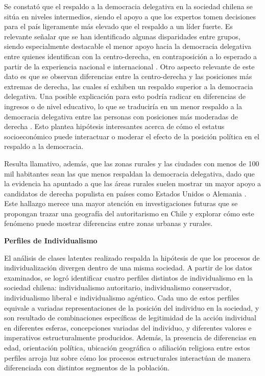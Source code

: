 \documentclass[12pt,twoside]{templates/facsothesis}
\begin{document}
Se constató que el respaldo a la democracia delegativa en la sociedad chilena se sitúa en niveles intermedios, siendo el apoyo a que los expertos tomen decisiones para el país ligeramente más elevado que el respaldo a un líder fuerte. Es relevante señalar que se han identificado algunas disparidades entre grupos, siendo especialmente destacable el menor apoyo hacia la democracia delegativa entre quienes identifican con la centro-derecha, en contraposición a lo esperado a partir de la experiencia nacional \citep{navia2019} e internacional \citep{donovan2021}. Otro aspecto relevante de este dato es que se observan diferencias entre la centro-derecha y las posiciones más extremas de derecha, las cuales sí exhiben un respaldo superior a la democracia delegativa. Una posible explicación para esto podría radicar en diferencias de ingresos o de nivel educativo, lo que se traduciría en un menor respaldo a la democracia delegativa entre las personas con posiciones más moderadas de derecha \citep{kang2018}. Esto plantea hipótesis interesantes acerca de cómo el estatus socioeconómico puede interactuar o moderar el efecto de la posición política en el respaldo a la democracia.

Resulta llamativo, además, que las zonas rurales y las ciudades con menos de 100 mil habitantes sean las que menos respaldan la democracia delegativa, dado que la evidencia ha apuntado a que las áreas rurales suelen mostrar un mayor apoyo a candidatos de derecha populista en países como Estados Unidos \citep{schafft2021} o Alemania \citep{deppisch2022}. Este hallazgo merece una mayor atención en investigaciones futuras que se propongan trazar una geografía del autoritarismo en Chile y explorar cómo este fenómeno puede mostrar diferencias entre zonas urbanas y rurales.

\textbf{Perfiles de Individualismo}

El análisis de clases latentes realizado respalda la hipótesis de que los procesos de individualización divergen dentro de una misma sociedad. A partir de los datos examinados, se logró identificar cuatro perfiles distintos de individualismo en la sociedad chilena: individualismo autoritario, individualismo conservador, individualismo liberal e individualismo agéntico. Cada uno de estos perfiles equivale a variadas representaciones de la posición del individuo en la sociedad, y son resultado de combinaciones específicas de legitimidad de la acción individual en diferentes esferas, concepciones variadas del individuo, y diferentes valores e imperativos estructuralmente producidos. Además, la presencia de diferencias en edad, orientación política, ubicación geográfica o afiliación religiosa entre estos perfiles arroja luz sobre cómo los procesos estructurales interactúan de manera diferenciada con distintos segmentos de la población.
\end{document}
